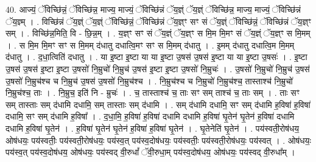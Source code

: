 \documentclass[17pt]{extarticle}
\begin{document}
40. आज्यं॒ ॅविच्छि॑न्नं॒ ॅविच्छि॑न्न॒ माज्य॒ माज्यं॒ ॅविच्छि॑न्नं ॅय॒ज्ञ्ं ॅय॒ज्ञ्ं ॅविच्छि॑न्न॒ माज्य॒ माज्यं॒ ॅविच्छि॑न्नं ॅय॒ज्ञ्म् । . विच्छि॑न्नं ॅय॒ज्ञ्ं ॅय॒ज्ञ्ं ॅविच्छि॑न्नं॒ ॅविच्छि॑न्नं ॅय॒ज्ञ्ꣳ सꣳ सं ॅय॒ज्ञ्ं ॅविच्छि॑न्नं॒ ॅविच्छि॑न्नं ॅय॒ज्ञ्ꣳ सम् । . विच्छि॑न्न॒मिति॒ वि - छि॒न्न॒म् । . य॒ज्ञ्ꣳ सꣳ सं ॅय॒ज्ञ्ं ॅय॒ज्ञ्ꣳ स मि॒म मि॒मꣳ सं ॅय॒ज्ञ्ं ॅय॒ज्ञ्ꣳ स मि॒मम् । . स मि॒म मि॒मꣳ सꣳ स मि॒मम् द॑धातु दधात्वि॒मꣳ सꣳ स मि॒मम् द॑धातु । . इ॒मम् द॑धातु दधात्वि॒म मि॒मम् द॑धातु । . द॒धा॒त्विति॑ दधातु । . या इ॒ष्टा इ॒ष्टा या या इ॒ष्टा उ॒षस॑ उ॒षस॑ इ॒ष्टा या या इ॒ष्टा उ॒षसः॑ । . इ॒ष्टा उ॒षस॑ उ॒षस॑ इ॒ष्टा इ॒ष्टा उ॒षसो॑ नि॒म्रुचो॑ नि॒म्रुच॑ उ॒षस॑ इ॒ष्टा इ॒ष्टा उ॒षसो॑ नि॒म्रुचः॑ । . उ॒षसो॑ नि॒म्रुचो॑ नि॒म्रुच॑ उ॒षस॑ उ॒षसो॑ नि॒म्रुच॑श्च च नि॒म्रुच॑ उ॒षस॑ उ॒षसो॑ नि॒म्रुच॑श्च । . नि॒म्रुच॑श्च च नि॒म्रुचो॑ नि॒म्रुच॑श्च॒ तास्ताश्च॑ नि॒म्रुचो॑ नि॒म्रुच॑श्च॒ ताः । . नि॒म्रुच॒ इति॑ नि - म्रुचः॑ । . च॒ तास्ताश्च॑ च॒ ताः सꣳ सम् ताश्च॑ च॒ ताः सम् । . ताः सꣳ सम् तास्ताः सम् द॑धामि दधामि॒ सम् तास्ताः सम् द॑धामि । . सम् द॑धामि दधामि॒ सꣳ सम् द॑धामि ह॒विषा॑ ह॒विषा॑ दधामि॒ सꣳ सम् द॑धामि ह॒विषा᳚ । . द॒धा॒मि॒ ह॒विषा॑ ह॒विषा॑ दधामि दधामि ह॒विषा॑ घृ॒तेन॑ घृ॒तेन॑ ह॒विषा॑ दधामि दधामि ह॒विषा॑ घृ॒तेन॑ । . ह॒विषा॑ घृ॒तेन॑ घृ॒तेन॑ ह॒विषा॑ ह॒विषा॑ घृ॒तेन॑ । . घृ॒तेनेति॑ घृ॒तेन॑ । . पय॑स्वती॒रोष॑धय॒ ओष॑धयः॒ पय॑स्वतीः॒ पय॑स्वती॒रोष॑धयः॒ पय॑स्व॒त् पय॑स्व॒दोष॑धयः॒ पय॑स्वतीः॒ पय॑स्वती॒रोष॑धयः॒ पय॑स्वत् । . ओष॑धयः॒ पय॑स्व॒त् पय॑स्व॒दोष॑धय॒ ओष॑धयः॒ पय॑स्वद् वी॒रुधां᳚ ॅवी॒रुधा॒म् पय॑स्व॒दोष॑धय॒ ओष॑धयः॒ पय॑स्वद् वी॒रुधा᳚म् । \newline
\pagebreak
{}
\end{document}
